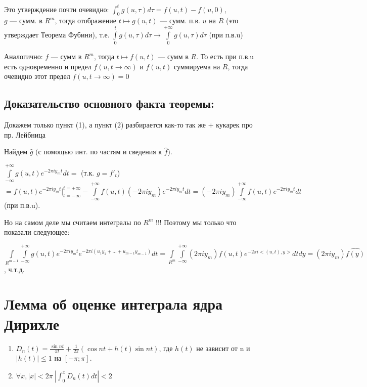 \documentclass[paper=a4, fontsize=17pt]{article}
\begin{document}
Это утверждение почти очевидно: $\int_{0}^{t}g(u, \tau)d\tau = f(u, t) - f(u, 0)$,\\
$g$ --- сумм. в $R^m$, тогда отображение $t \mapsto g(u, t)$ --- сумм. п.в. $u$ на $R$ (это утверждает Теорема Фубини), т.е. $\int\limits_{0}^{t}g(u, \tau)d\tau \rightarrow \int\limits_{0}^{+\infty}g(u, \tau)d\tau$ (при п.в.u)

Аналогично: $f$ --- сумм в  $R^m$, тогда $ t \mapsto f(u, t)$ --- сумм в  $R$. То есть при п.в.u есть одновременно и предел $f(u, t \rightarrow \infty)$ и $f(u, t)$ суммируема на $R$, тогда очевидно этот предел $f(u, t \rightarrow \infty) = 0$

\subsection{Доказательство основного факта теоремы:}

Докажем только пункт (1), а пункт (2) разбирается как-то так же + кукарек про пр. Лейбница

Найдем $\hat{g}$ (с помощью инт. по частям и сведения к $\hat{f}$).

$\int\limits_{-\infty}^{+\infty}g(u, t)e^{-2\pi i y_m t}dt = $ (т.к. $g = f'_t$) $ =  f(u, t)e^{-2\pi i y_m t}|_{t=-\infty}^{t=+\infty} - \int\limits_{-\infty}^{+\infty}f(u, t)(-2\pi i y_m)e^{-2\pi i y_m t}dt = (-2\pi i y_m) \int\limits_{-\infty}^{+\infty}f(u, t)e^{-2\pi i y_m t}dt$ (при п.в.u).

Но на самом деле мы считаем интегралы по $R^m$ !!! Поэтому мы только что показали следующее:

$\int\limits_{R^{m-1}}\int\limits_{-\infty}^{+\infty}g(u, t)e^{-2\pi i y_m t}e^{-2\pi i (u_{1}y_{1}+\ldots+u_{m-1}y_{m-1})}dt = \int\limits_{R^{m}}\int\limits_{-\infty}^{+\infty}(2\pi i y_m)f(u, t)e^{-2\pi i <(u, t), y>}dt dy = (2\pi i y_m) \hat{f(y)}$, ч.т.д.


\section{Лемма об оценке интеграла ядра Дирихле}
\begin{enumerate}
    \item $D_n(t) = \frac{\sin nt}{\pi t} + \frac{1}{2\pi}(\cos nt + h(t)\sin nt)$, где $h(t)$ не зависит от n и $|h(t)| \leq 1$
        на $[-\pi;\pi]$.
    \item $\forall x, |x| < 2\pi\ |\int_0^x D_n(t) dt| < 2$
\end{enumerate}
\end{document}
